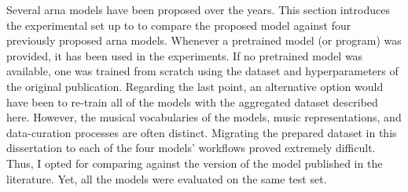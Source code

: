 
Several \gls{arna} models have been proposed over the years.
This section introduces the experimental set up to to
compare the proposed model against four previously proposed
\gls{arna} models. Whenever a pretrained model (or program)
was provided, it has been used in the experiments. If no
pretrained model was available, one was trained from
scratch using the dataset and hyperparameters of the
original publication. Regarding the last point, an
alternative option would have been to re-train all of the
models with the aggregated dataset described here. However,
the musical vocabularies of the models, music
representations, and data-curation processes are often
distinct. Migrating the prepared dataset in this
dissertation to each of the four models' workflows proved
extremely difficult. Thus, I opted for comparing against the
version of the model published in the literature. Yet, all
the models were evaluated on the same test set.
